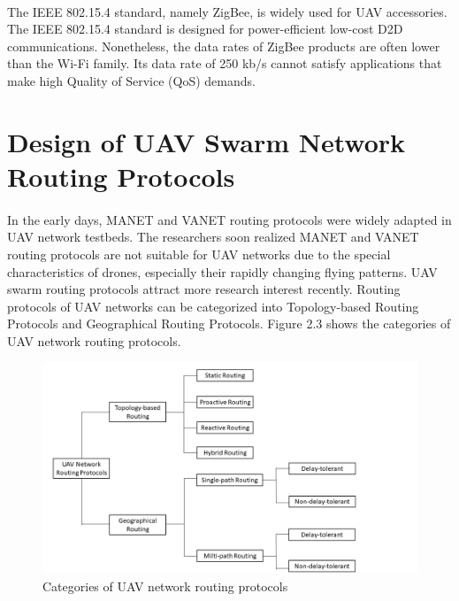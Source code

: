 \documentclass[a4paper,12pt]{report}
\begin{document}
\paragraph{}
The IEEE 802.15.4 standard, namely ZigBee, is widely used for UAV accessories. The IEEE 802.15.4 standard is designed for power-efficient low-cost D2D communications\cite{Shi_2021}. Nonetheless, the data rates of ZigBee products are often lower than the Wi-Fi family. Its data rate of 250 kb/s cannot satisfy applications that make high Quality of Service (QoS) demands.

\section{Design of UAV Swarm Network Routing Protocols}

\paragraph{}
In the early days, MANET and VANET routing protocols were widely adapted in UAV network testbeds\cite{8772093}. The researchers soon realized MANET and VANET routing protocols are not suitable for UAV networks due to the special characteristics of drones, especially their rapidly changing flying patterns. UAV swarm routing protocols attract more research interest recently. Routing protocols of UAV networks can be categorized into Topology-based Routing Protocols and Geographical Routing Protocols\cite{8772093}. Figure 2.3 shows the categories of UAV network routing protocols.

\begin{figure}[h]
\begin{center}
\includegraphics[width=1.05\linewidth]{images/routing.jpg}
\caption{Categories of UAV network routing protocols}
\end{center}
\end{figure}
\end{document}

